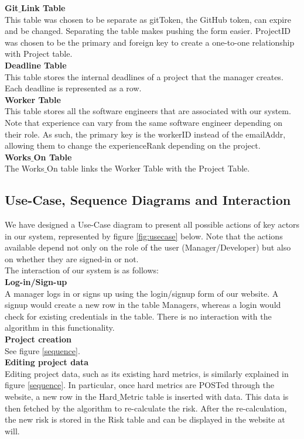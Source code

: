 \documentclass[a4paper]{article}
\theoremstyle{plain}
\theoremstyle{definition}
\theoremstyle{remark}
\begin{document}
\noindent\textbf{Git$\_$Link Table}\\
This table was chosen to be separate as gitToken, the GitHub token, can expire and be changed. Separating the table makes pushing the form easier. ProjectID was chosen to be the primary and foreign key to create a one-to-one relationship with Project table. \\

\noindent\textbf{Deadline Table}\\
This table stores the internal deadlines of a project that the manager creates. Each deadline is represented as a row. \\

\noindent\textbf{Worker Table}\\
This table stores all the software engineers that are associated with our system. Note that experience can vary from the same software engineer depending on their role. As such, the primary key is the workerID instead of the emailAddr, allowing them to change the experienceRank depending on the project. \\

\noindent \textbf{Works$\_$On Table} \\
The Works$\_$On table links the Worker Table with the Project Table.
\subsection*{Use-Case, Sequence Diagrams and Interaction}
We have designed a Use-Case diagram to present all possible actions of key actors in our system, represented by figure \ref{fig:usecase} below. Note that the actions available depend not only on the role of the user (Manager/Developer) but also on whether they are signed-in or not.\\
The interaction of our system is as follows:\\

\noindent\textbf{Log-in/Sign-up} \\
A manager logs in or signs up using the login/signup form of our website. A signup would create a new row in the table Managers, whereas a login would check for existing credentials in the table. There is no interaction with the algorithm in this functionality. \\

\noindent \textbf{Project creation}\\
See figure \ref{sequence}. \\

\noindent\textbf{Editing project data}\\
Editing project data, such as its existing hard metrics, is similarly explained in figure \ref{sequence}. In particular, once hard metrics are POSTed through the website, a new row in the Hard$\_$Metric table is inserted with data. This data is then fetched by the algorithm to re-calculate the risk. After the re-calculation, the new risk is stored in the Risk table and can be displayed in the website at will. \\
\end{document}
